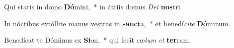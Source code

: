 \item Qui statis in domo \textbf{Dó}mini,~* in átriis domus \textit{De}\textit{i} \textbf{nos}tri.
\item In nóctibus extóllite manus vestras in \textbf{sanc}ta,~* et benedí\textit{ci}\textit{te} \textbf{Dó}minum.
\item Benedícat te Dóminus ex \textbf{Si}on,~* qui fecit cæ\textit{lum} \textit{et} \textbf{ter}ram.
